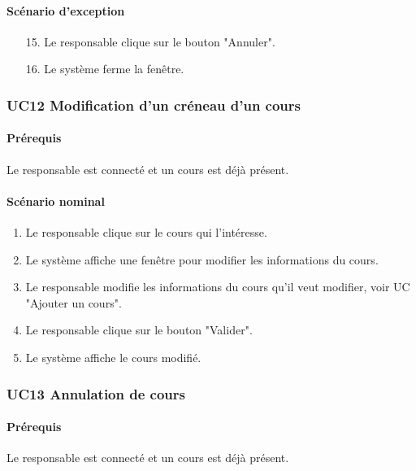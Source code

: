 \documentclass[a4paper,12pt]{article}
\begin{document}
\paragraph{Scénario d'exception}
\begin{enumerate}
    \item[15.] Le responsable clique sur le bouton "Annuler".
    \item[16.] Le système ferme la fenêtre.
\end{enumerate}

\subsubsection{UC12 Modification d'un créneau d'un cours}
\paragraph{Prérequis} Le responsable est connecté et un cours est déjà présent.

\paragraph{Scénario nominal}
\begin{enumerate}
    \item Le responsable clique sur le cours qui l'intéresse.
    \item Le système affiche une fenêtre pour modifier les informations du cours.
    \item Le responsable modifie les informations du cours qu'il veut modifier, voir UC "Ajouter un cours".
    \item Le responsable clique sur le bouton "Valider".
    \item Le système affiche le cours modifié.
\end{enumerate}

\subsubsection{UC13 Annulation de cours}
\paragraph{Prérequis} Le responsable est connecté et un cours est déjà présent.
\end{document}
